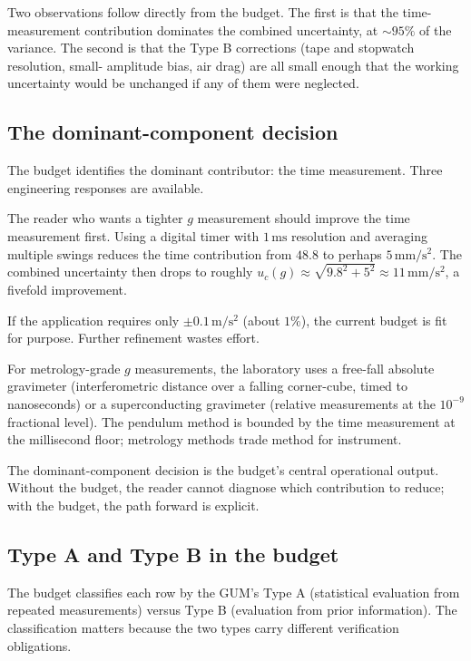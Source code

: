 Two observations follow directly from the budget. The first is that
the time-measurement contribution dominates the combined
uncertainty, at $\sim 95\%$ of the variance. The second is that
the Type B corrections (tape and stopwatch resolution, small-
amplitude bias, air drag) are all small enough that the working
uncertainty would be unchanged if any of them were neglected.

\subsection{The dominant-component decision}

The budget identifies the dominant contributor: the time
measurement. Three engineering responses are available.

 The reader who wants a
tighter $g$ measurement should improve the time measurement
first. Using a digital timer with $1\,\si{\milli\second}$
resolution and averaging multiple swings reduces the time
contribution from $48.8$ to perhaps $5\,\si{\milli\meter\per
\second\squared}$. The combined uncertainty then drops to roughly
$u_{c}(g) \approx \sqrt{9.8^{2} + 5^{2}} \approx 11\,\si{\milli
\meter\per\second\squared}$, a fivefold improvement.

 If the application requires only
$\pm 0.1\,\si{\meter\per\second\squared}$ (about $1\%$), the
current budget is fit for purpose. Further refinement wastes
effort.

 For metrology-grade $g$ measurements,
the laboratory uses a free-fall absolute gravimeter (interferometric
distance over a falling corner-cube, timed to nanoseconds) or a
superconducting gravimeter (relative measurements at the
$10^{-9}$ fractional level). The pendulum method is bounded by
the time measurement at the millisecond floor; metrology methods
trade method for instrument.

The dominant-component decision is the budget's central operational
output. Without the budget, the reader cannot diagnose which
contribution to reduce; with the budget, the path forward is
explicit.

\subsection{Type A and Type B in the budget}

The budget classifies each row by the GUM's Type A (statistical
evaluation from repeated measurements) versus Type B (evaluation
from prior information). The classification matters because the
two types carry different verification obligations.

